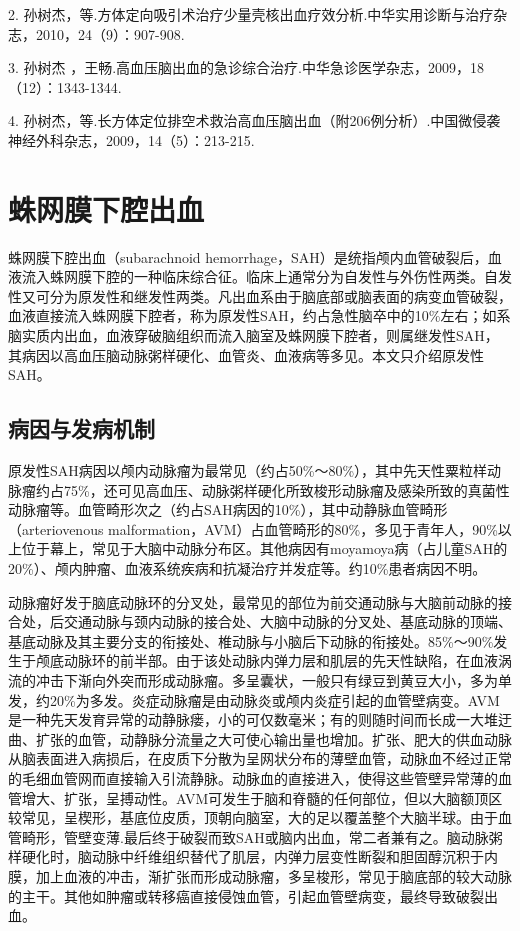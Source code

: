 2.
孙树杰，等.方体定向吸引术治疗少量壳核出血疗效分析.中华实用诊断与治疗杂志，2010，24（9）：907-908.

3. 孙树杰
，王畅.高血压脑出血的急诊综合治疗.中华急诊医学杂志，2009，18（12）：1343-1344.

4.
孙树杰，等.长方体定位排空术救治高血压脑出血（附206例分析）.中国微侵袭神经外科杂志，2009，14（5）：213-215.

\protect\hypertarget{text00244.html}{}{}

\section{蛛网膜下腔出血}

蛛网膜下腔出血（subarachnoid
hemorrhage，SAH）是统指颅内血管破裂后，血液流入蛛网膜下腔的一种临床综合征。临床上通常分为自发性与外伤性两类。自发性又可分为原发性和继发性两类。凡出血系由于脑底部或脑表面的病变血管破裂，血液直接流入蛛网膜下腔者，称为原发性SAH，约占急性脑卒中的10\%左右；如系脑实质内出血，血液穿破脑组织而流入脑室及蛛网膜下腔者，则属继发性SAH，其病因以高血压脑动脉粥样硬化、血管炎、血液病等多见。本文只介绍原发性SAH。

\subsection{病因与发病机制}

原发性SAH病因以颅内动脉瘤为最常见（约占50\%～80\%），其中先天性粟粒样动脉瘤约占75\%，还可见高血压、动脉粥样硬化所致梭形动脉瘤及感染所致的真菌性动脉瘤等。血管畸形次之（约占SAH病因的10\%），其中动静脉血管畸形（arteriovenous
malformation，AVM）占血管畸形的80\%，多见于青年人，90\%以上位于幕上，常见于大脑中动脉分布区。其他病因有moyamoya病（占儿童SAH的20\%）、颅内肿瘤、血液系统疾病和抗凝治疗并发症等。约10\%患者病因不明。

动脉瘤好发于脑底动脉环的分叉处，最常见的部位为前交通动脉与大脑前动脉的接合处，后交通动脉与颈内动脉的接合处、大脑中动脉的分叉处、基底动脉的顶端、基底动脉及其主要分支的衔接处、椎动脉与小脑后下动脉的衔接处。85\%～90\%发生于颅底动脉环的前半部。由于该处动脉内弹力层和肌层的先天性缺陷，在血液涡流的冲击下渐向外突而形成动脉瘤。多呈囊状，一般只有绿豆到黄豆大小，多为单发，约20\%为多发。炎症动脉瘤是由动脉炎或颅内炎症引起的血管壁病变。AVM是一种先天发育异常的动静脉瘘，小的可仅数毫米；有的则随时间而长成一大堆迂曲、扩张的血管，动静脉分流量之大可使心输出量也增加。扩张、肥大的供血动脉从脑表面进入病损后，在皮质下分散为呈网状分布的薄壁血管，动脉血不经过正常的毛细血管网而直接输入引流静脉。动脉血的直接进入，使得这些管壁异常薄的血管增大、扩张，呈搏动性。AVM可发生于脑和脊髓的任何部位，但以大脑额顶区较常见，呈楔形，基底位皮质，顶朝向脑室，大的足以覆盖整个大脑半球。由于血管畸形，管壁变薄.最后终于破裂而致SAH或脑内出血，常二者兼有之。脑动脉粥样硬化时，脑动脉中纤维组织替代了肌层，内弹力层变性断裂和胆固醇沉积于内膜，加上血液的冲击，渐扩张而形成动脉瘤，多呈梭形，常见于脑底部的较大动脉的主干。其他如肿瘤或转移癌直接侵蚀血管，引起血管壁病变，最终导致破裂出血。

